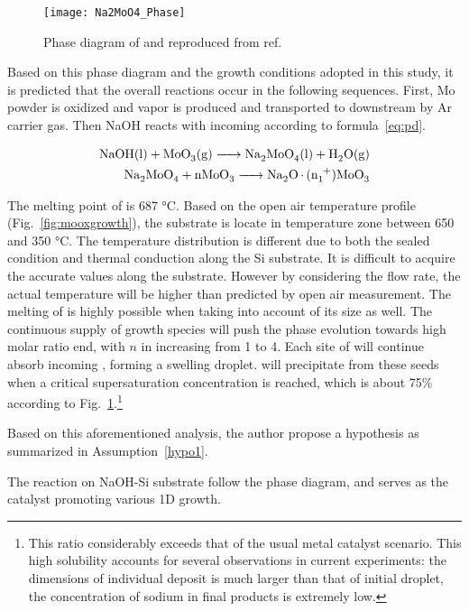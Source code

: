 \begin{figure}[htb]
\centering
\texttt{[image: Na2MoO4\_Phase]}
\caption[Phase diagram of Na-Mo-O system]{Phase diagram of  and  reproduced from ref.~\cite{Hoermann1929}}
\label{fig:ch4pd}
\end{figure}

Based on this phase diagram and the growth conditions adopted in this study, it is predicted that the overall reactions occur in the following sequences. First, Mo powder is oxidized and  vapor is produced and transported to downstream by Ar carrier gas. Then NaOH reacts with incoming  according to formula~\ref{eq:pd}. 

\begin{align}\label{eq:pd}
\cee{NaOH(l) + MoO3(g) -> Na2MoO4(l) + H2O(g)}\\
\cee{Na2MoO4 + nMoO3   -> Na2O.(n+1)MoO3}
\end{align}

The melting point of  is 687 \si{\degreeCelsius}. Based on the open air temperature profile (Fig.~\ref{fig:mooxgrowth}), the substrate is locate in temperature zone between 650 and 350 \si{\degreeCelsius}. The temperature distribution is different due to both the sealed condition and thermal conduction along the Si substrate. It is difficult to acquire the accurate values along the substrate. However by considering the flow rate, the actual temperature will be higher than predicted by open air measurement.\cite{Subannajui2010} The melting of  is highly possible when taking into account of its size as well.\cite{Bruggemann1997} The continuous supply of  growth species will push the phase evolution towards high  molar ratio end, with $n$ in  increasing from 1 to 4. Each site of  will continue absorb incoming , forming a swelling droplet.  will precipitate from these seeds when a critical supersaturation concentration is reached, which is about 75\% according to Fig.~\ref{fig:ch4pd}.\footnote{This ratio considerably exceeds that of the usual metal catalyst scenario. This high solubility accounts for several observations in current experiments: the dimensions of individual deposit is much larger than that of initial droplet, the concentration of sodium in final products is extremely low.}

Based on this aforementioned analysis, the author propose a hypothesis as summarized in Assumption~\ref{hypo1}.
\begin{hypothesis}\label{hypo1}
The reaction on NaOH-Si substrate follow the phase diagram, and  serves as the catalyst promoting various 1D  growth. 
\end{hypothesis}

